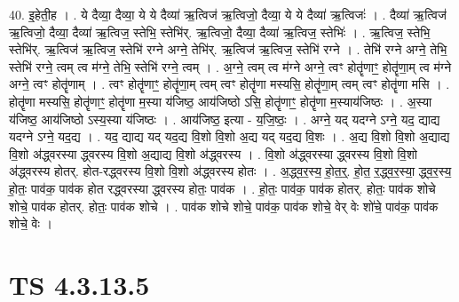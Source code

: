\documentclass[17pt]{extarticle}
\begin{document}
40. इ॒हेती॒ह । . ये दैव्या॒ दैव्या॒ ये ये दैव्या॑ ऋ॒त्विज॑ ऋ॒त्विजो॒ दैव्या॒ ये ये दैव्या॑ ऋ॒त्विजः॑ । . दैव्या॑ ऋ॒त्विज॑ ऋ॒त्विजो॒ दैव्या॒ दैव्या॑ ऋ॒त्विज॒ स्तेभि॒ स्तेभि॑र्. ऋ॒त्विजो॒ दैव्या॒ दैव्या॑ ऋ॒त्विज॒ स्तेभिः॑ । . ऋ॒त्विज॒ स्तेभि॒ स्तेभि॑र्. ऋ॒त्विज॑ ऋ॒त्विज॒ स्तेभि॑ रग्ने अग्ने॒ तेभि॑र्. ऋ॒त्विज॑ ऋ॒त्विज॒ स्तेभि॑ रग्ने । . तेभि॑ रग्ने अग्ने॒ तेभि॒ स्तेभि॑ रग्ने॒ त्वम् त्व म॑ग्ने॒ तेभि॒ स्तेभि॑ रग्ने॒ त्वम् । . अ॒ग्ने॒ त्वम् त्व म॑ग्ने अग्ने॒ त्वꣳ होतॄ॑णाꣳ॒॒ होतॄ॑णा॒म् त्व म॑ग्ने अग्ने॒ त्वꣳ होतॄ॑णाम् । . त्वꣳ होतॄ॑णाꣳ॒॒ होतॄ॑णा॒म् त्वम् त्वꣳ होतॄ॑णा मस्यसि॒ होतॄ॑णा॒म् त्वम् त्वꣳ होतॄ॑णा मसि । . होतॄ॑णा मस्यसि॒ होतॄ॑णाꣳ॒॒ होतॄ॑णा म॒स्या य॑जिष्ठ॒ आय॑जिष्ठो ऽसि॒ होतॄ॑णाꣳ॒॒ होतॄ॑णा म॒स्याय॑जिष्ठः । . अ॒स्या य॑जिष्ठ॒ आय॑जिष्ठो ऽस्य॒स्या य॑जिष्ठः । . आय॑जिष्ठ॒ इत्या - य॒जि॒ष्ठः॒ । . अग्ने॒ यद् यदग्ने ऽग्ने॒ यद॒ द्याद्य यदग्ने ऽग्ने॒ यद॒द्य । . यद॒ द्याद्य यद् यद॒द्य वि॒शो वि॒शो अ॒द्य यद् यद॒द्य वि॒शः । . अ॒द्य वि॒शो वि॒शो अ॒द्याद्य वि॒शो अ॑द्ध्वरस्या द्ध्वरस्य वि॒शो अ॒द्याद्य वि॒शो अ॑द्ध्वरस्य । . वि॒शो अ॑द्ध्वरस्या द्ध्वरस्य वि॒शो वि॒शो अ॑द्ध्वरस्य होतर्. होत-रद्ध्वरस्य वि॒शो वि॒शो अ॑द्ध्वरस्य होतः । . अ॒द्ध्व॒र॒स्य॒ हो॒त॒र्॒. हो॒त॒ र॒द्ध्व॒र॒स्या॒ द्ध्व॒र॒स्य॒ हो॒तः॒ पाव॑क॒ पाव॑क होत रद्ध्वरस्या द्ध्वरस्य होतः॒ पाव॑क । . हो॒तः॒ पाव॑क॒ पाव॑क होतर्. होतः॒ पाव॑क शोचे शोचे॒ पाव॑क होतर्. होतः॒ पाव॑क शोचे । . पाव॑क शोचे शोचे॒ पाव॑क॒ पाव॑क शोचे॒ वेर् वेः शो॑चे॒ पाव॑क॒ पाव॑क शोचे॒ वेः । \newline
\pagebreak
{}

\section{ TS 4.3.13.5 }
\end{document}
